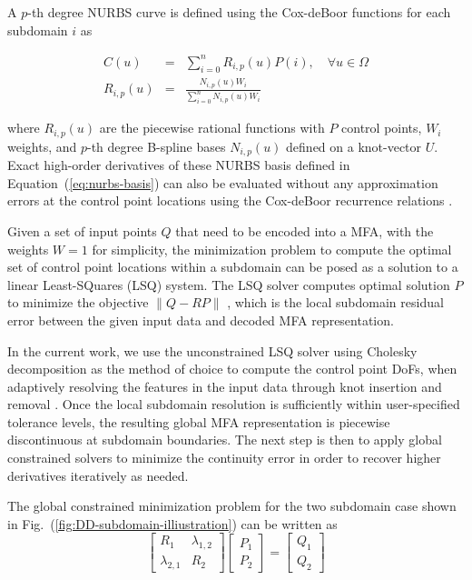 \documentclass[conference]{IEEEtran}
\newcommand{\eqt}[1]{Equation~(\ref{#1})}
\newcommand{\fig}[1]{Fig.~(\ref{#1})}
\begin{document}
A $p$-th degree NURBS curve \cite{nurbs-book} is defined using the Cox-deBoor functions for each subdomain $i$ as

\begin{eqnarray}
C(u) &=& \sum_{i=0}^{n} R_{i,p}(u) P(i), \quad \forall u \in \Omega \\
R_{i,p}(u) &=& \frac{N_{i,p}(u) W_i}{\sum_{i=0}^{n} N_{i,p}(u) W_i}
\label{eq:nurbs-basis}
\end{eqnarray}

where $R_{i,p}(u)$ are the piecewise rational functions with $P$ control points, $W_i$ weights, and $p$-th degree B-spline bases $N_{i,p}(u)$ defined on a knot-vector $U$. Exact high-order derivatives of these NURBS basis defined in \eqt{eq:nurbs-basis} can also be evaluated without any approximation errors at the control point locations using the Cox-deBoor recurrence relations \cite{de1983approximation}.

Given a set of input points $Q$ that need to be encoded into a MFA, with the weights $W=1$ for simplicity, the minimization problem to compute the optimal set of control point locations within a subdomain can be posed as a solution to a linear Least-SQuares (LSQ) system. The LSQ solver computes optimal solution $P$ to minimize the objective $\left\lVert Q - R P \right\rVert$ \cite{nurbs-book}, which is the local subdomain residual error between the given input data and decoded MFA representation.


In the current work, we use the unconstrained LSQ solver using Cholesky decomposition as the method of choice to compute the control point DoFs, when adaptively resolving the features in the input data through knot insertion and removal \cite{li-adaptive-2005}. Once the local subdomain resolution is sufficiently within user-specified tolerance levels, the resulting global MFA representation is piecewise discontinuous at subdomain boundaries. The next step is then to apply global constrained solvers to minimize the continuity error in order to recover higher derivatives iteratively as needed.

The global constrained minimization problem for the two subdomain case shown in \fig{fig:DD-subdomain-illiustration} can be written as
%
\begin{equation}
\left[
\begin{array}{c|c}
R_{1} & \lambda_{1,2} \\
\hline
\lambda_{2,1} & R_{2}
\end{array}
\right]
\left[
\begin{array}{c}
P_{1} \\
P_{2}
\end{array}
\right]
=
\left[
\begin{array}{c}
Q_{1} \\
Q_{2}
\end{array}
\right]
\label{eq:global-system}
\end{equation}
\end{document}
